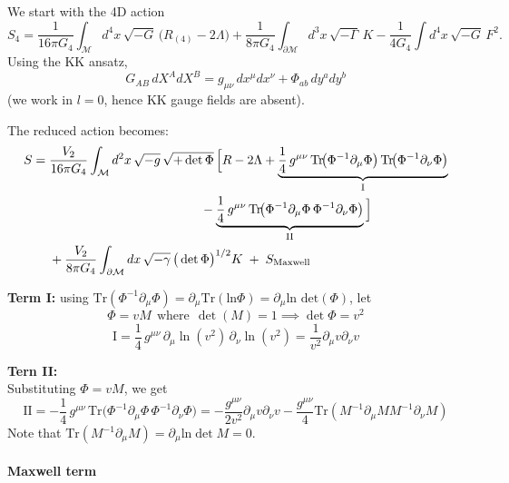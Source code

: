\documentclass[a4paper,11pt]{article}
\begin{document}
We start with the 4D action
\begin{equation}
S_4=\frac{1}{16\pi G_4}\int_{\mathcal M} d^4x\,\sqrt{-G}\,\big(R_{(4)}-2\Lambda\big)
+\frac{1}{8\pi G_4}\int_{\partial\mathcal M} d^3x\,\sqrt{-\Gamma}\,K
-\frac{1}{4G_4}\int d^4x\,\sqrt{-G}\,F^2 .
\label{eq:KK-S4}
\end{equation}
Using the KK ansatz,
\begin{equation}
G_{AB}\,dX^A dX^B=g_{\mu\nu}\,dx^\mu dx^\nu+\Phi_{ab}\,dy^a dy^b
\label{eq:KK-ansatz}
\end{equation}
(we work in $l=0$, hence KK gauge fields are absent).

The reduced action becomes:
\begin{equation}
\begin{aligned}
S={}&\frac{V_2}{16\pi G_4}\int_{\mathcal M} d^2x\,\sqrt{-g}\,\sqrt{+\det\Phi}\,
\Big[R-2\Lambda
+\underbrace{\frac14\,g^{\mu\nu}\,\text{Tr}\!\big(\Phi^{-1}\partial_\mu\Phi\big)\,\text{Tr}\!\big(\Phi^{-1}\partial_\nu\Phi\big)}_{\text{I}}\\
&\hspace{4.2cm}-\underbrace{\frac14\,g^{\mu\nu}\,\text{Tr}\!\big(\Phi^{-1}\partial_\mu\Phi\,\Phi^{-1}\partial_\nu\Phi\big)}_{\text{II}}\Big]\\
&+\frac{V_2}{8\pi G_4}\int_{\partial\mathcal M} dx\,\sqrt{-\gamma}\,\big(\det\Phi\big)^{1/2}K\;+\;S_{\text{Maxwell}}
\end{aligned}
\label{eq:KK-reduced}
\end{equation}

\textbf{Term I:}
using $\text{Tr}(\Phi^{-1}\partial_\mu \Phi)= \partial_\mu \text{Tr}(\text{ln} \Phi)= \partial_\mu \text{ln} \text{ det}(\Phi)$, let 
\begin{equation}
  \Phi= vM  \ \  \text{where} \ \ \det(M)=1 \implies  \det \Phi= v^2
\end{equation}
\begin{equation}
\text{I}=\frac14\,g^{\mu\nu}\,\partial_\mu\ln(v^2)\,\partial_\nu\ln(v^2) = \frac{1}{ v^2} \partial_\mu v \partial_\nu v
\label{eq:KK-termI}
\end{equation}

\textbf{Tern II:}\\
Substituting $\Phi=vM$, we get
\begin{equation}\label{Eq:term2}
\text{II}=-\frac14\,g^{\mu\nu}\,\text{Tr}\!\big(\Phi^{-1}\partial_\mu\Phi\,\Phi^{-1}\partial_\nu\Phi\big)=-\frac{g^{\mu \nu}}{2 v^2} \partial_\mu v \partial_\nu v - \frac{g^{\mu \nu}}{4} \text{Tr}(M^{-1}\partial_\mu M M^{-1}\partial_\nu M)
\end{equation}
Note that $\text{Tr}(M^{-1}\partial_\mu M)= \partial_\mu \text{ln} \det M=0$.\\
\\
\textbf{Maxwell term}
\end{document}
